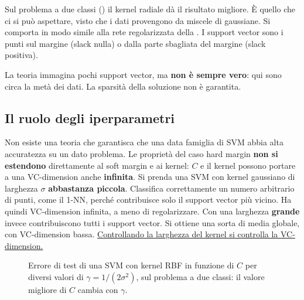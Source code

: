 Sul problema a due classi () il kernel radiale dà il risultato migliore. È quello che ci
si può aspettare, visto che i dati provengono da miscele di gaussiane. Si comporta in modo simile alla rete
regolarizzata della . I support vector sono i punti sul margine (slack nulla) o dalla
parte sbagliata del margine (slack positiva).

\begin{attenzione}
La teoria immagina pochi support vector, ma \textbf{non è sempre vero}: qui sono circa la metà dei dati. La sparsità
della soluzione non è garantita.
\end{attenzione}

\subsection{Il ruolo degli iperparametri}

Non esiste una teoria che garantisca che una data famiglia di SVM abbia alta accuratezza su un dato problema. Le
proprietà del caso hard margin \textbf{non si estendono} direttamente al soft margin e ai kernel: $C$ e il kernel
possono portare a una VC-dimension anche \textbf{infinita}. Si prenda una SVM con kernel gaussiano di larghezza
$\sigma$ \textbf{abbastanza piccola}. Classifica correttamente un numero arbitrario di punti, come il 1-NN, perché
contribuisce solo il support vector più vicino. Ha quindi VC-dimension infinita, a meno di regolarizzare. Con una
larghezza \textbf{grande} invece contribuiscono tutti i support vector. Si ottiene una sorta di media globale, con
VC-dimension bassa. \uline{Controllando la larghezza del kernel si controlla la VC-dimension.}

\begin{figure}[ht]
\centering
{}
\caption{Errore di test di una SVM con kernel RBF in funzione di $C$ per diversi valori di $\gamma=1/(2\sigma^2)$, sul
problema a due classi: il valore migliore di $C$ cambia con $\gamma$.}
\label{fig:svm-C-gamma}
\end{figure}

